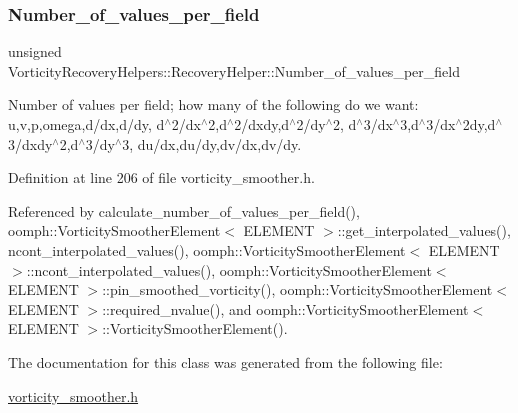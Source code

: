 \subsubsection{\texorpdfstring{Number\+\_\+of\+\_\+values\+\_\+per\+\_\+field}{Number\_of\_values\_per\_field}}
{\footnotesize\ttfamily unsigned Vorticity\+Recovery\+Helpers\+::\+Recovery\+Helper\+::\+Number\+\_\+of\+\_\+values\+\_\+per\+\_\+field\hspace{0.3cm}{\ttfamily [private]}}



Number of values per field; how many of the following do we want\+: u,v,p,omega,d/dx,d/dy, d$^\wedge$2/dx$^\wedge$2,d$^\wedge$2/dxdy,d$^\wedge$2/dy$^\wedge$2, d$^\wedge$3/dx$^\wedge$3,d$^\wedge$3/dx$^\wedge$2dy,d$^\wedge$3/dxdy$^\wedge$2,d$^\wedge$3/dy$^\wedge$3, du/dx,du/dy,dv/dx,dv/dy. 



Definition at line 206 of file vorticity\+\_\+smoother.\+h.



Referenced by calculate\+\_\+number\+\_\+of\+\_\+values\+\_\+per\+\_\+field(), oomph\+::\+Vorticity\+Smoother\+Element$<$ E\+L\+E\+M\+E\+N\+T $>$\+::get\+\_\+interpolated\+\_\+values(), ncont\+\_\+interpolated\+\_\+values(), oomph\+::\+Vorticity\+Smoother\+Element$<$ E\+L\+E\+M\+E\+N\+T $>$\+::ncont\+\_\+interpolated\+\_\+values(), oomph\+::\+Vorticity\+Smoother\+Element$<$ E\+L\+E\+M\+E\+N\+T $>$\+::pin\+\_\+smoothed\+\_\+vorticity(), oomph\+::\+Vorticity\+Smoother\+Element$<$ E\+L\+E\+M\+E\+N\+T $>$\+::required\+\_\+nvalue(), and oomph\+::\+Vorticity\+Smoother\+Element$<$ E\+L\+E\+M\+E\+N\+T $>$\+::\+Vorticity\+Smoother\+Element().



The documentation for this class was generated from the following file\+:\begin{DoxyCompactItemize}
\item 
\hyperlink{vorticity__smoother_8h}{vorticity\+\_\+smoother.\+h}\end{DoxyCompactItemize}
